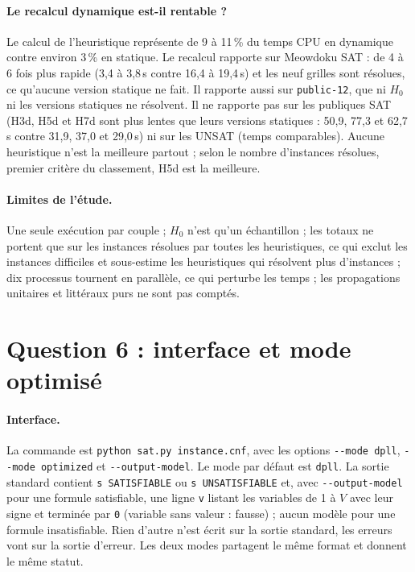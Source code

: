 \documentclass[11pt,a4paper]{article}
\begin{document}
\paragraph{Le recalcul dynamique est-il rentable ?} Le calcul de l'heuristique représente de 9 à 11\,\% du temps CPU en dynamique contre environ 3\,\% en statique. Le recalcul rapporte sur Meowdoku SAT : de 4 à 6 fois plus rapide (3,4 à 3,8\,s contre 16,4 à 19,4\,s) et les neuf grilles sont résolues, ce qu'aucune version statique ne fait. Il rapporte aussi sur \texttt{public-12}, que ni $H_0$ ni les versions statiques ne résolvent. Il ne rapporte pas sur les publiques SAT (H3d, H5d et H7d sont plus lentes que leurs versions statiques : 50,9, 77,3 et 62,7\,s contre 31,9, 37,0 et 29,0\,s) ni sur les UNSAT (temps comparables). Aucune heuristique n'est la meilleure partout ; selon le nombre d'instances résolues, premier critère du classement, H5d est la meilleure.

\paragraph{Limites de l'étude.} Une seule exécution par couple ; $H_0$ n'est qu'un échantillon ; les totaux ne portent que sur les instances résolues par toutes les heuristiques, ce qui exclut les instances difficiles et sous-estime les heuristiques qui résolvent plus d'instances ; dix processus tournent en parallèle, ce qui perturbe les temps ; les propagations unitaires et littéraux purs ne sont pas comptés.

\section{Question 6 : interface et mode optimisé}\label{sec:q6}

\paragraph{Interface.} La commande est \texttt{python sat.py instance.cnf}, avec les options \texttt{-{}-mode dpll}, \texttt{-{}-mode optimized} et \texttt{-{}-output-model}. Le mode par défaut est \texttt{dpll}. La sortie standard contient \texttt{s SATISFIABLE} ou \texttt{s UNSATISFIABLE} et, avec \texttt{-{}-output-model} pour une formule satisfiable, une ligne \texttt{v} listant les variables de 1 à $V$ avec leur signe et terminée par \texttt{0} (variable sans valeur : fausse) ; aucun modèle pour une formule insatisfiable. Rien d'autre n'est écrit sur la sortie standard, les erreurs vont sur la sortie d'erreur. Les deux modes partagent le même format et donnent le même statut.
\end{document}

